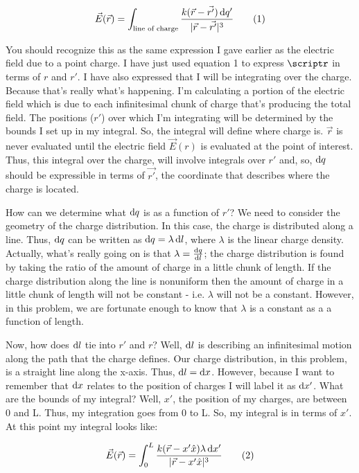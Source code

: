 \begin{homeworkProblem}[Problem 23.42]
\[ \vec{E}(\vec{r}) = \int_{\text{line of charge}} \frac{k
(\vec{r}-\vec{r'}) \diff q'}{|\vec{r}-\vec{r'}|^3} \addtag \]

You should recognize this as the same expression I gave earlier as the
electric field due to a point charge. I have just used equation 1 to
express $\scriptr$ in terms of $r$ and $r'$. I have also expressed that
I will be integrating over the charge. Because that's really what's
happening. I'm calculating a portion of the electric field which is due
to each infinitesimal chunk of charge that's producing the total field.
The positions ($r'$) over which I'm integrating will be determined by
the bounds I set up in my integral. So, the integral will define where
charge is. $\vec{r}$ is never evaluated until the electric field
$\vec{E}(r)$ is evaluated at the point of interest. Thus, this integral
over the charge, will involve integrals over $r'$ and, so, $\mathop{}\!\mathrm{d} q$
should be expressible in terms of $\vec{r'}$, the coordinate that
describes where the charge is located.

How can we determine what $\mathop{}\!\mathrm{d} q$ is as a function of $r'$? We need to
consider the geometry of the charge distribution. In this case, the
charge is distributed along a line. Thus, $\mathop{}\!\mathrm{d} q$ can be written as $
\mathop{}\!\mathrm{d} q = \lambda \mathop{}\!\mathrm{d} l$, where $\lambda$ is the linear charge
density. Actually, what's really going on is that $\lambda = \frac{\mathop{}\!\mathrm{d}
q}{\mathop{}\!\mathrm{d} l}$; the charge distribution is found by taking the ratio of
the amount of charge in a little chunk of length. If the charge
distribution along the line is nonuniform then the amount of charge in a
little chunk of length will not be constant - i.e. $\lambda$ will not be
a constant. However, in this problem, we are fortunate enough to know
that $\lambda$ is a constant as a a function of length.

Now, how does $\mathop{}\!\mathrm{d} l$ tie into $r'$ and $r$? Well, $\mathop{}\!\mathrm{d} l$ is
describing an infinitesimal motion along the path that the charge
defines. Our charge distribution, in this problem, is a straight line
along the x-axis. Thus, $\mathop{}\!\mathrm{d} l = \mathop{}\!\mathrm{d} x$. However, because I want to
remember that $\mathop{}\!\mathrm{d} x$ relates to the position of charges I will label
it as $\mathop{}\!\mathrm{d} x'$. What are the bounds of my integral? Well, $x'$, the
position of my charges, are between 0 and L. Thus, my integration goes
from 0 to L. So, my integral is in terms of $x'$. At this point my
integral looks like: 

\[ \vec{E}(\vec{r}) = \int_0^L \frac{k (\vec{r}-x'\hat{x}) \lambda \diff
x'}{|\vec{r}-x'\hat{x}|^3} \addtag \]


\end{homeworkProblem}
